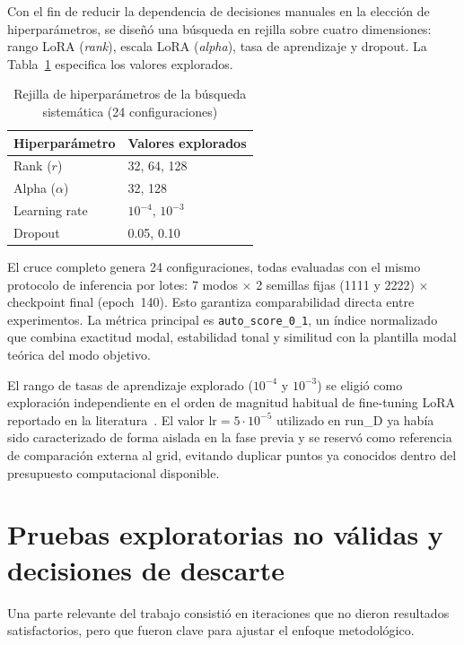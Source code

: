 \documentclass[%
    school=etsisi,%
    type=pfg,%
    degree=61CD,%
]{upm-report}
\begin{document}
Con el fin de reducir la dependencia de decisiones manuales en la elecci\'on de hiperpar\'ametros, se dise\~n\'o una b\'usqueda en rejilla sobre cuatro dimensiones: rango LoRA (\textit{rank}), escala LoRA (\textit{alpha}), tasa de aprendizaje y dropout. La Tabla~\ref{tab:stage1-grid} especifica los valores explorados.

\begin{table}[htbp]
    \centering
    \caption{Rejilla de hiperpar\'ametros de la b\'usqueda sistem\'atica (24 configuraciones)}
    \label{tab:stage1-grid}
    \begin{tabular}{ll}
        \toprule
        \textbf{Hiperpar\'ametro} & \textbf{Valores explorados} \\
        \midrule
        Rank ($r$)      & 32, 64, 128 \\
        Alpha ($\alpha$) & 32, 128 \\
        Learning rate   & $10^{-4}$, $10^{-3}$ \\
        Dropout         & 0.05, 0.10 \\
        \bottomrule
    \end{tabular}
\end{table}

El cruce completo genera 24 configuraciones, todas evaluadas con el mismo protocolo de inferencia por lotes: 7 modos $\times$ 2 semillas fijas (1111 y 2222) $\times$ checkpoint final (epoch~140). Esto garantiza comparabilidad directa entre experimentos. La m\'etrica principal es \texttt{auto\_score\_0\_1}, un \'indice normalizado que combina exactitud modal, estabilidad tonal y similitud con la plantilla modal te\'orica del modo objetivo.

El rango de tasas de aprendizaje explorado ($10^{-4}$ y $10^{-3}$) se eligi\'o como exploraci\'on independiente en el orden de magnitud habitual de fine-tuning LoRA reportado en la literatura~\cite{hu2022lora,ding2023peft}. El valor $\text{lr} = 5 \cdot 10^{-5}$ utilizado en run\_D ya hab\'ia sido caracterizado de forma aislada en la fase previa y se reserv\'o como referencia de comparaci\'on externa al grid, evitando duplicar puntos ya conocidos dentro del presupuesto computacional disponible.

\section{Pruebas exploratorias no v\'alidas y decisiones de descarte}

Una parte relevante del trabajo consisti\'o en iteraciones que no dieron resultados satisfactorios, pero que fueron clave para ajustar el enfoque metodol\'ogico.
\end{document}
